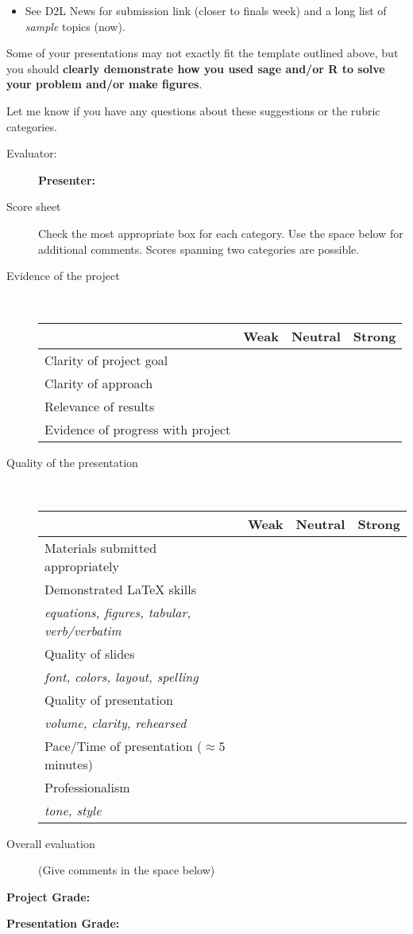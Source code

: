 \documentclass[12pt]{article}
\begin{document}
\begin{description}
\begin{itemize}
\item See D2L News for submission link (closer to finals week) and a long list of \emph{sample} topics (now).
\end{itemize}
Some of your presentations may not exactly fit the template outlined above, but you should \textbf{clearly demonstrate how you used sage and\slash{}or R to solve your problem and\slash{}or make figures}.
\end{description}
\vfill
Let me know if you have any questions about these suggestions or the rubric categories.
\newpage
\begin{description}
\item[Evaluator:] \underline{\hspace{5cm}}\hfill\textbf{Presenter: \underline{\hspace{5cm}}}

\item[Score sheet] Check the most appropriate box for each category.  Use the space below for additional comments.  Scores spanning two categories are possible.
\item[Evidence of the project]\,

\begin{tabular}{l | p{1in}| p{1in}| p{1in}|}
 & Weak & Neutral & Strong\\
\hline
Clarity of project goal & & &\\[10pt]
\hline
Clarity of approach & & &\\[10pt]
\hline
Relevance of results & & &\\[10pt]
\hline
Evidence of progress with project & & &\\[10pt]
\hline
\end{tabular}

\item[Quality of the presentation]\,


\begin{tabular}{l | p{1in}| p{1in}| p{1in}|}
 & Weak & Neutral & Strong\\
\hline
Materials submitted appropriately & & & \\[10pt]
\hline
Demonstrated \LaTeX{} skills & & & \\
\hfill\small{\it{equations, figures, tabular, verb\slash{}verbatim}} & & &\\
\hline
Quality of slides & & &\\
\hfill\small{\it font, colors, layout, spelling} & & & \\
\hline
Quality of presentation & & &\\
\hfill\small{\it volume, clarity, rehearsed} & & & \\
\hline
Pace\slash{}Time of presentation (\(\approx 5\) minutes)& & &\\[10pt]
\hline
Professionalism & & &\\
\hfill\small{\it{tone, style}}&&&\\
\hline

\end{tabular}

\item[Overall evaluation] (Give comments in the space below)
\vfill
\end{description}

\hfill\textbf{Project Grade: \underline{\hspace{5cm}}}

\hfill\textbf{Presentation Grade: \underline{\hspace{5cm}}}
\end{document}
